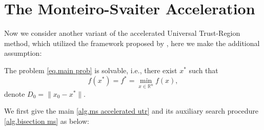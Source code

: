 \documentclass{article}
\begin{document}
\section{The Monteiro-Svaiter Acceleration}
Now we consider another variant of the accelerated Universal Trust-Region method, which utilized the framework proposed by \citet{monteiro2013accelerated}, here we make the additional assumption:
\begin{assumption}
    \label{assm.solvable}
    The problem \eqref{eq.main prob} is solvable, i.e., there exist $x^*$ such that 
    \begin{equation*}
        f(x^*) = f^* = \min_{x\in\mathbb{R}^n} f(x),
    \end{equation*}
    denote $D_0 = \|x_0-x^*\|.$
\end{assumption}

We first give the main \autoref{alg.ms accelerated utr} and its auxiliary search procedure \autoref{alg.bisection ms} as below:
\end{document}
